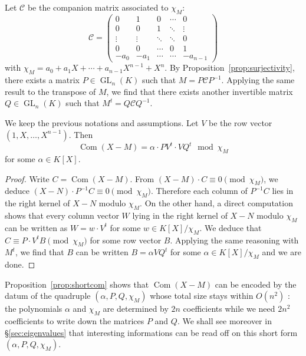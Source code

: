 \documentclass{sig-alternate-05-2015}
\DeclareMathOperator{\GL}{GL}
\DeclareMathOperator{\com}{Com}
\begin{document}
Let $\mathscr{C}$ be the companion matrix associated to $\chi_M$:
\begin{equation}
\label{eq:companion}
\mathscr{C} = \left( \begin{matrix}
0 & 1 & 0 & \cdots & 0 \\
0 & 0 & 1 & \ddots & \vdots \\
\vdots & \vdots & \ddots & \ddots & 0 \\
0 & 0 & \cdots & 0 & 1 \\
-a_0 & -a_1 & \cdots & \cdots & -a_{n-1}
\end{matrix} \right)
\end{equation}
with $\chi_M = a_0 + a_1 X + \cdots + a_{n-1} X^{n-1} + X^n$.
By Proposition~\ref{prop:surjectivity}, there exists a matrix 
$P \in \GL_n(K)$ such that $M = P \mathscr{C} P^{-1}$. Applying the same
result to the transpose of $M$, we find that there exists another
invertible matrix $Q \in \GL_n(K)$ such that $M^t = Q \mathscr{C} Q^{-1}$.

\begin{prop}
\label{prop:shortcom}
We keep the previous notations and assumptions.
Let $V$ be the row vector $(1, X, \ldots, X^{n-1})$. Then
\begin{equation}
\label{eq:shortcom}
\com(X{-}M) = \alpha \cdot P V^t \cdot V Q^t
\mod \chi_M
\end{equation}
for some $\alpha \in K[X]$.
\end{prop}

\begin{proof}
Write $C = \com(X{-}M)$. From $(X{-}M) \cdot C \equiv 0 
\pmod{\chi_M}$, we deduce $(X{-}N) \cdot P^{-1} C \equiv 0 \pmod{\chi_M}$. 
Therefore each column of $P^{-1} C$ lies in the right kernel of $X{-}N$
modulo $\chi_M$. On the other hand, a direct computation shows that
every column vector $W$ lying in the right kernel of $X{-}N$ modulo 
$\chi_M$ can be written as $W = w \cdot V^t$ for some $w \in 
K[X]/\chi_M$. We deduce that $C \equiv P \cdot V^t B \pmod{\chi_M}$
for some row vector $B$.
Applying the same reasoning with $M^t$, we find that $B$ can be
written $B = \alpha V Q^t$ for some $\alpha \in K[X]/\chi_M$ and
we are done.
\end{proof}

Proposition~\ref{prop:shortcom} shows that $\com(X{-}M)$ can be encoded 
by the datum of the quadruple $(\alpha, P, Q, \chi_M)$ whose total size 
stays within $O(n^2)$ : the polynomials $\alpha$ and $\chi_M$ are 
determined by $2n$ coefficients while we need $2n^2$ coefficients to 
write down the matrices $P$ and $Q$. 
We shall see moreover in \S \ref{sec:eigenvalues} that interesting
informations can be read off on this short form $(\alpha, P, Q, 
\chi_M)$.
\end{document}
